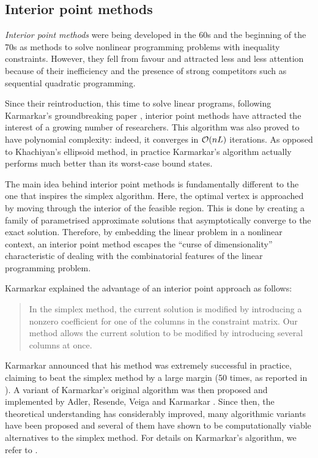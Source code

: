 %
%
\subsection{Interior point methods}

{\em Interior point methods} were being developed in the 60s and the 
beginning of the 70s as methods to solve nonlinear programming problems 
with inequality constraints. 
However, they fell from favour and attracted less and less attention
because of their inefficiency and the presence of strong competitors
such as sequential quadratic programming.

Since their reintroduction, this time to solve linear programs, 
following Karmarkar's groundbreaking paper
\cite{Karmarkar}, interior point methods have attracted 
the interest of a growing number of researchers.
This algorithm was also proved to have polynomial complexity: 
indeed, it converges in $\mathcal{O}(nL)$ iterations. As opposed to
Khachiyan's ellipsoid method, in practice Karmarkar's algorithm actually
performs much better than its worst-case bound states.

The main idea behind interior point methods is fundamentally different 
to the one that inspires the simplex algorithm. Here, the optimal vertex 
is approached by moving through the interior of the feasible region.
This is done by creating a family of parametrised approximate solutions
that asymptotically converge to the exact solution.
Therefore, by embedding the linear problem in a nonlinear context,
an interior point method escapes the ``curse of dimensionality''
characteristic of dealing with the combinatorial features of the 
linear programming problem.

Karmarkar \cite{Karmarkar} explained the advantage of an
interior point approach as follows:
\begin{quotation}
In the simplex method, the current solution is modified by introducing
a nonzero coefficient for one of the columns in the constraint
matrix. Our method allows the current solution to be modified by
introducing several columns at once.
\end{quotation}


Karmarkar announced that his method was extremely successful in practice, 
claiming to beat the simplex method by a large margin (50 times,
as reported in \cite{MWright92}).
A variant of Karmarkar's original algorithm was then proposed and 
implemented by Adler, Resende, Veiga and Karmarkar 
\cite{AdlerResendeVeigaKarmarkar89}.
Since then, the theoretical understanding has considerably improved,
many algorithmic variants have been proposed and several of
them have shown to be computationally viable alternatives to the
simplex method.
For details on Karmarkar's algorithm, we refer to
\cite[Chapter~6]{FangPuthenpura93}.

